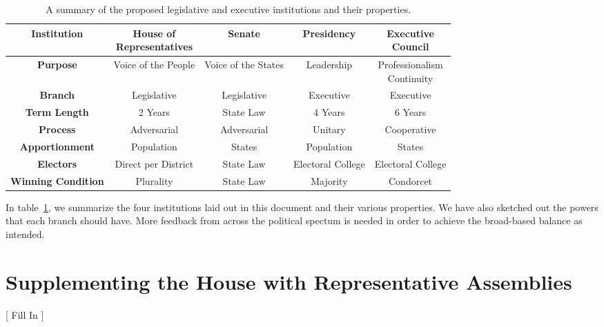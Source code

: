 \documentclass{article}
\begin{document}
\begin{table}[ht]
\centering
\renewcommand{\arraystretch}{1.5}
\begin{tabular}{|c|c|c|c|c|}
\hline
\textbf{Institution} & \makecell{House of \\ Representatives} & Senate & Presidency & \makecell{Executive \\ Council}  \\
\hline
\textbf{Purpose} & Voice of the People & Voice of the States & Leadership & \makecell{Professionalism \\ Continuity} \\
\hline
\textbf{Branch} & Legislative & Legislative & Executive & Executive \\
\hline
\textbf{Term Length} & 2 Years & State Law & 4 Years & 6 Years \\
\hline
\textbf{Process} & Adversarial & Adversarial & Unitary & Cooperative \\
\hline
\textbf{Apportionment} & Population & States & Population & States  \\
\hline
\textbf{Electors} & Direct per District & State Law  & Electoral College & Electoral College  \\
\hline
\textbf{Winning Condition} & Plurality & State Law & Majority & Condorcet  \\
\hline
\end{tabular}
\caption{A summary of the proposed legislative and executive institutions and their properties. }
\label{table:institutions}
\end{table}

In table~\ref{table:institutions}, we summarize the four institutions laid out in this document and their various properties. We have also sketched out the powers that each branch should have. More feedback from across the political spectum is needed in order to achieve the broad-based balance as intended.

\appendix
\section{Supplementing the House with Representative Assemblies}
\label{appendix:house}

[ Fill In ]
\end{document}
